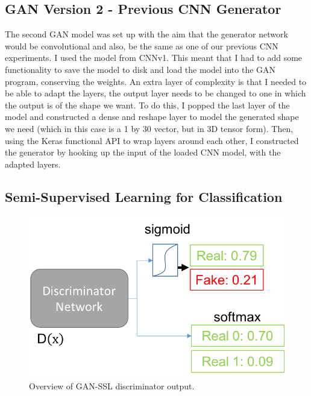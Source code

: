 \documentclass[12pt,a4paper,twoside]{report}
\begin{document}
\subsection{GAN Version 2 - Previous CNN Generator}

The second GAN model was set up with the aim that the generator network would be convolutional and also, be the same as one of our previous CNN experiments. I used the model from CNNv1. This meant that I had to add some functionality to save the model to disk and load the model into the GAN program, conserving the weights. An extra layer of complexity is that I needed to be able to adapt the layers, the output layer needs to be changed to one in which the output is of the shape we want. To do this, I popped the last layer of the model and constructed a dense and reshape layer to model the generated shape we need (which in this case is a 1 by 30 vector, but in 3D tensor form). Then, using the Keras functional API to wrap layers around each other, I constructed the generator by hooking up the input of the loaded CNN model, with the adapted layers. 



\subsection{Semi-Supervised Learning for Classification}





\begin{figure}[H]
\centering
\includegraphics[scale=0.8]{gan-ssl}
\caption{Overview of GAN-SSL discriminator output.}
\label{fig:gan-ssl}
\end{figure}
\end{document}
